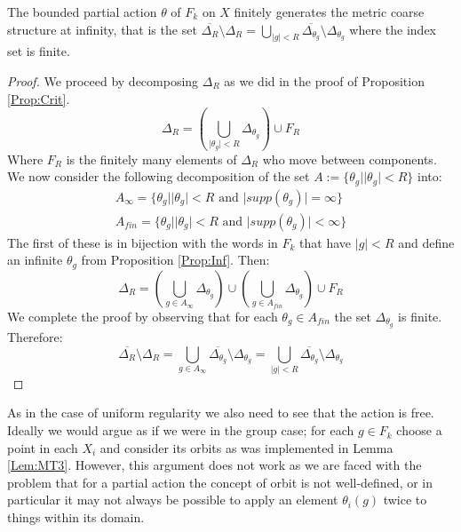 \begin{corollary}
The bounded partial action $\theta$ of $F_{k}$ on $X$ finitely generates the metric coarse structure at infinity, that is the set $\overline{\Delta_{R}}\setminus \Delta_{R} = \bigcup_{\vert g \vert < R}\overline{\Delta_{\theta_{g}}}\setminus \Delta_{\theta_{g}}$ where the index set is finite.
\end{corollary}
\begin{proof}
We proceed by decomposing $\Delta_{R}$ as we did in the proof of Proposition \ref{Prop:Crit}.
\begin{equation*}
\Delta_{R}=(\bigcup_{\vert \theta_{g} \vert < R}\Delta_{\theta_{g}})\cup F_{R}
\end{equation*}
Where $F_{R}$ is the finitely many elements of $\Delta_{R}$ who move between components. We now consider the following decomposition of the set $A:=\lbrace \theta_{g} | \vert \theta_{g}\vert < R\rbrace$ into:
\begin{eqnarray*}
A_{\infty}=\lbrace \theta_{g} | \vert \theta_{g} \vert < R \mbox{ and } \vert supp(\theta_{g})\vert = \infty \rbrace \\
A_{fin}=\lbrace \theta_{g} | \vert \theta_{g} \vert < R\mbox{ and } \vert supp(\theta_{g})\vert < \infty \rbrace
\end{eqnarray*}
The first of these is in bijection with the words in $F_{k}$ that have $\vert g \vert < R$ and define an infinite $\theta_{g}$ from Proposition \ref{Prop:Inf}. Then:
\begin{equation*}
\Delta_{R}=(\bigcup_{g \in A_{\infty}}\Delta_{\theta_{g}})\cup (\bigcup_{g \in A_{fin}}\Delta_{\theta_{g}}) \cup F_{R}
\end{equation*}
We complete the proof by observing that for each $\theta_{g} \in A_{fin}$ the set $\Delta_{\theta_{g}}$ is finite. Therefore:
\begin{equation*}
\overline{\Delta_{R}}\setminus \Delta_{R} = \bigcup_{g \in A_{\infty}}\overline{\Delta_{\theta_{g}}}\setminus \Delta_{\theta_{g}}= \bigcup_{\vert g \vert < R}\overline{\Delta_{\theta_{g}}}\setminus \Delta_{\theta_{g}}
\end{equation*}\end{proof}

As in the case of uniform regularity we also need to see that the action is free. Ideally we would argue as if we were in the group case; for each $g \in F_{k}$ choose a point in each $X_{i}$ and consider its orbits as was implemented in Lemma \ref{Lem:MT3}. However, this argument does not work as we are faced with the problem that for a partial action the concept of orbit is not well-defined, or in particular it may not always be possible to apply an element $\theta_{i}(g)$ twice to things within its domain. 

